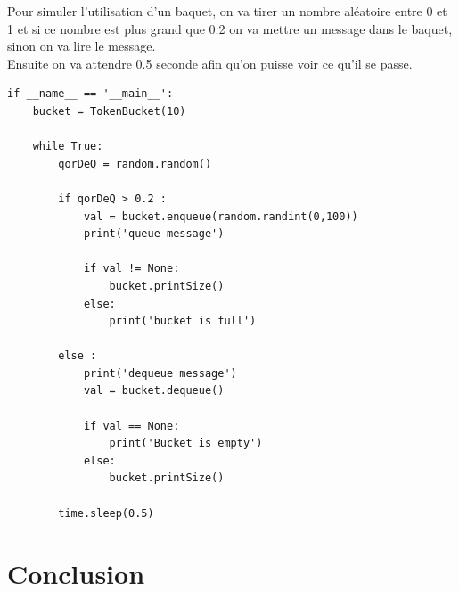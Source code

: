 \documentclass{article}
\begin{document}
Pour simuler l'utilisation d'un baquet, on va tirer un nombre aléatoire entre 0 et 1 et si ce nombre est plus grand que 0.2 on va mettre un message dans le baquet, sinon on va lire le message.\\

Ensuite on va attendre 0.5 seconde afin qu'on puisse voir ce qu'il se passe.

\begin{lstlisting}
if __name__ == '__main__':
	bucket = TokenBucket(10)
	
	while True:
		qorDeQ = random.random()
		
		if qorDeQ > 0.2 :
			val = bucket.enqueue(random.randint(0,100))
			print('queue message')
			
			if val != None:
				bucket.printSize()
			else:
				print('bucket is full')
		
		else :
			print('dequeue message')
			val = bucket.dequeue()
		
			if val == None:
				print('Bucket is empty')
			else:
				bucket.printSize()
	
		time.sleep(0.5)
\end{lstlisting}

\section{Conclusion}
\end{document}
